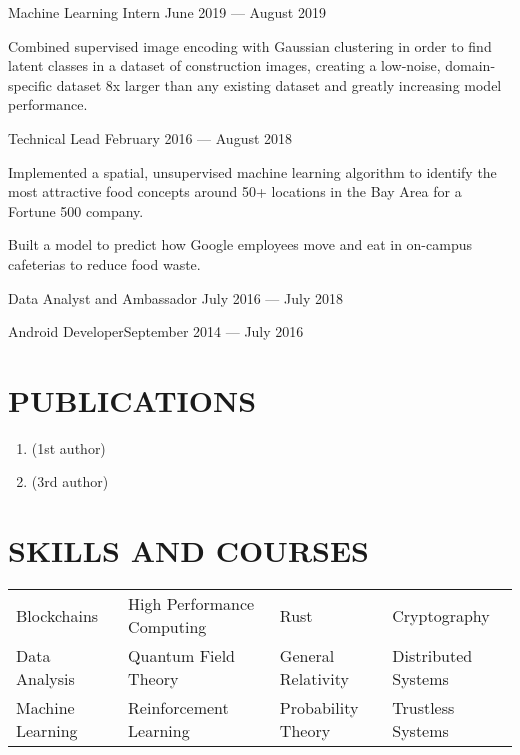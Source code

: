 \documentclass[10pt]{article}
\begin{document}
                {Machine Learning Intern}
                {June 2019 --- August 2019}
                    \begin{accomplishments}
                        \item Combined supervised image encoding with Gaussian clustering in order to find latent classes in a dataset of construction images, creating a low-noise, domain-specific dataset 8x larger than any existing dataset and greatly increasing model performance.
                    \end{accomplishments}

								{Technical Lead}
								{February 2016 --- August 2018}                  		
	                   \begin{accomplishments} 
	                    		\item Implemented a spatial, unsupervised machine learning algorithm to identify the most attractive food concepts around 50+ locations in the Bay Area for a Fortune 500 company.
                          \item Built a model to predict how Google employees move and eat in on-campus cafeterias to reduce food waste.
	                    \end{accomplishments}
	                    		
	   		
	   			{Data Analyst and Ambassador}
	   			{July 2016 --- July 2018}
        \vspace{0.5em}
                  	 
          {Android Developer}{September 2014 --- July 2016}
        \vspace{0.5em}
                  

\section*{PUBLICATIONS}

\begin{enumerate}
  \item {} (1st author)
  \item {} (3rd author)
\end{enumerate}

\vspace{-0.6em}
\section*{SKILLS AND COURSES}
				\setlength{\columnsep}{.5pt}
				\begin{tabu}{X[2c]X[2.5c]X[2c]X[2c]}
					Blockchains          & High Performance Computing & Rust                 & Cryptography \\
					Data Analysis 			 & Quantum Field Theory & General Relativity   & Distributed Systems \\
         Machine Learning		 & Reinforcement Learning     & Probability Theory   & Trustless Systems \\
				\end{tabu}
 
\end{document}
